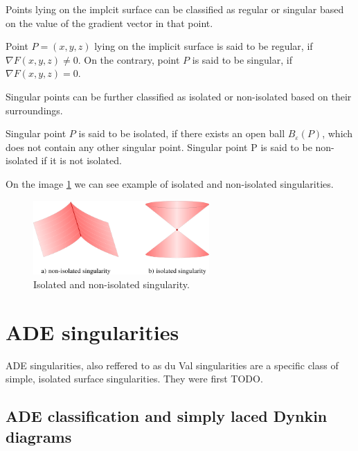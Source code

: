 Points lying on the implcit surface can be classified as regular or
singular based on the value of the gradient vector in that point.

\begin{definition}
    Point $P=(x,y,z)$ lying on the implicit surface is said to be regular,
    if $\nabla F(x, y, z) \neq 0$. On the contrary, point $P$ is said to be 
    singular, if $\nabla F(x, y, z) = 0$.
\end{definition}

Singular points can be further classified as isolated or non-isolated
based on their surroundings.

\begin{definition}
    Singular point $P$ is said to be isolated, if there exists an open ball
    $B_\varepsilon(P)$, which does not contain any other singular point.
    Singular point P is said to be non-isolated if it is not isolated.
\end{definition}

On the image \ref{img:2} we can see example of isolated and non-isolated
singularities.

\begin{figure}
    \centerline{\includegraphics[width=0.6\textwidth]{images/img2}}
    \caption[Isolated and non-isolated singularity]
    {Isolated and non-isolated singularity.}
    \label{img:2}
\end{figure}

\section*{ADE singularities}
\label{sub2.2}

ADE singularities, also reffered to as du Val singularities are a specific
class of simple, isolated surface singularities. They were first TODO.

\subsection*{ADE classification and simply laced Dynkin diagrams}
\label{subs2.2.1}

